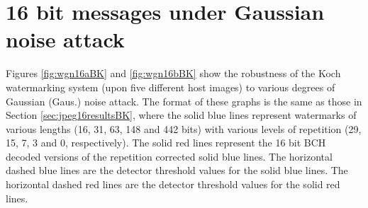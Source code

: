 \documentclass[12pt]{report}
\begin{document}
\section{16 bit messages under Gaussian noise attack}
\label{sec:gn16resultsBK}
Figures \ref{fig:wgn16aBK} and \ref{fig:wgn16bBK} show the robustness
of the Koch watermarking system (upon five different host images) to various degrees 
of Gaussian (Gaus.) noise attack. 
The format of these graphs is the same as those in Section
\ref{sec:jpeg16resultsBK}, where the solid blue lines represent watermarks of various lengths
(16, 31, 63, 148 and 442 bits) with various levels of repetition (29, 15, 7, 3 and 0, respectively).
The solid red lines represent the 16 bit BCH decoded versions of the repetition corrected solid blue lines.
The horizontal dashed blue lines are the detector threshold values for the solid blue lines.
The horizontal dashed red lines are the detector threshold values for the solid red lines.
\end{document}
